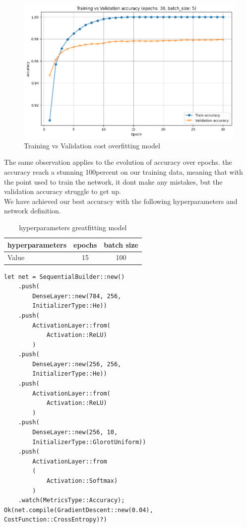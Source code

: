 \documentclass[a4paper, twocolumn, twoside]{article}
\begin{document}
	\begin{figure}[H]
		\begin{center}
			\includegraphics[width=\columnwidth]{images/accuracy_overfit.png}
		\end{center}
		\caption{Training vs Validation cost overfitting model}\label{fig:accuracy_overfit}
	\end{figure}

	The same observation applies to the evolution of accuracy over epochs.
	the accuracy reach a stunning 100percent on our training data, meaning that with
	the point used to train the network, it dont make any mistakes,
	but the validation accuracy struggle to get up.\\

	We have achieved our best accuracy with the following hyperparameters and network definition.

	\begin{table}[H]
	\centering
	\begin{tabular}{|l|c|c|}
	\hline
	hyperparameters & epochs & batch size  \\
	\hline
	Value & 15 & 100   \\
	\hline
	\end{tabular}
	\caption{hyperparameters greatfitting model}
	\end{table}


	\begin{verbatim}
let net = SequentialBuilder::new()
	.push(
		DenseLayer::new(784, 256,
		InitializerType::He))
	.push(
		ActivationLayer::from(
			Activation::ReLU)
		)
	.push(
		DenseLayer::new(256, 256,
		InitializerType::He))
	.push(
		ActivationLayer::from(
			Activation::ReLU)
		)
	.push(
		DenseLayer::new(256, 10,
		InitializerType::GlorotUniform))
	.push(
		ActivationLayer::from
		(
			Activation::Softmax)
		)
	.watch(MetricsType::Accuracy);
Ok(net.compile(GradientDescent::new(0.04), CostFunction::CrossEntropy)?)
	\end{verbatim}
\end{document}
